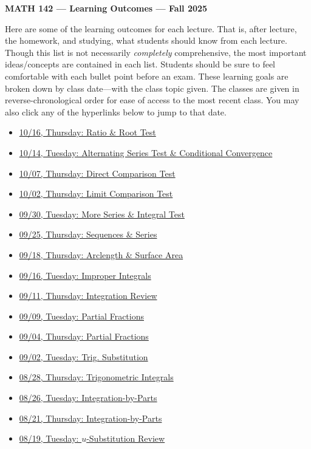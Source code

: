 \documentclass[11pt,letterpaper]{article}
\begin{document}
\begin{center} {\bfseries \LARGE MATH 142 --- Learning Outcomes --- Fall 2025} \end{center}

Here are some of the learning outcomes for each lecture. That is, after lecture, the homework, and studying, what students should know from each lecture. Though this list is not necessarily \textit{completely} comprehensive, the most important ideas/concepts are contained in each list. Students should be sure to feel comfortable with each bullet point before an exam. These learning goals are broken down by class date---with the class topic given. The classes are given in reverse-chronological order for ease of access to the most recent class. You may also click any of the hyperlinks below to jump to that date. 

\begin{itemize}
\item \hyperref[10-16]{10/16, Thursday: Ratio \& Root Test}
\item \hyperref[10-14]{10/14, Tuesday: Alternating Series Test \& Conditional Convergence}
\item \hyperref[10-07]{10/07, Thursday: Direct Comparison Test}
\item \hyperref[10-02]{10/02, Thursday: Limit Comparison Test}
\item \hyperref[09-30]{09/30, Tuesday: More Series \& Integral Test}
\item \hyperref[09-25]{09/25, Thursday: Sequences \& Series}
\item \hyperref[09-18]{09/18, Thursday: Arclength \& Surface Area}
\item \hyperref[09-16]{09/16, Tuesday: Improper Integrals}
\item \hyperref[09-11]{09/11, Thursday: Integration Review}
\item \hyperref[09-09]{09/09, Tuesday: Partial Fractions}
\item \hyperref[09-04]{09/04, Thursday: Partial Fractions}
\item \hyperref[09-02]{09/02, Tuesday: Trig. Substitution}
\item \hyperref[08-28]{08/28, Thursday: Trigonometric Integrals}
\item \hyperref[08-26]{08/26, Tuesday: Integration-by-Parts}
\item \hyperref[08-21]{08/21, Thursday: Integration-by-Parts}
\item \hyperref[08-19]{08/19, Tuesday: $u$-Substitution Review}
\end{itemize}
\end{document}
